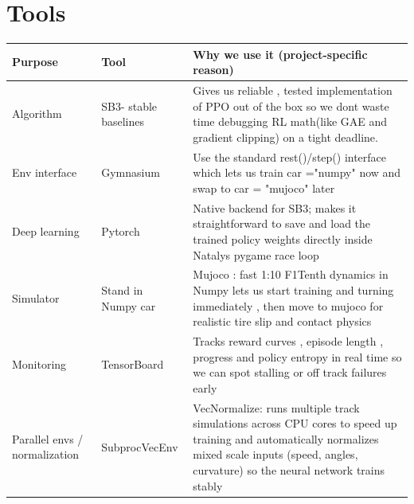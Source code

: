 \documentclass[11pt]{article}
\begin{document}
\section{Tools}
\begin{center}
\begin{tabular}{l l p{}}
\toprule
Purpose & Tool & Why we use it (project-specific reason)\\
\midrule
Algorithm & SB3- stable baselines  & Gives us reliable , tested implementation of PPO out of the box so we dont waste time debugging RL math(like GAE and gradient clipping) on a tight deadline.\\
Env interface & Gymnasium & Use the standard rest()/step() interface which lets us train car ="numpy" now and swap to car = "mujoco" later \\
Deep learning & Pytorch & Native backend for SB3; makes it straightforward to save and load the trained policy weights directly inside Natalys pygame race loop \\
Simulator & Stand in Numpy car & Mujoco : fast 1:10 F1Tenth dynamics in Numpy lets us start training and turning immediately , then move to mujoco for realistic tire slip and contact physics \\
Monitoring & TensorBoard & Tracks reward curves , episode length , progress and policy entropy in real time so we can spot stalling or off track failures early\\
Parallel envs / normalization & SubprocVecEnv & VecNormalize: runs multiple track simulations across CPU cores to speed up training and automatically normalizes mixed scale inputs (speed, angles, curvature) so the neural network trains stably\\
\bottomrule
\end{tabular}
\end{center}

\end{document}
